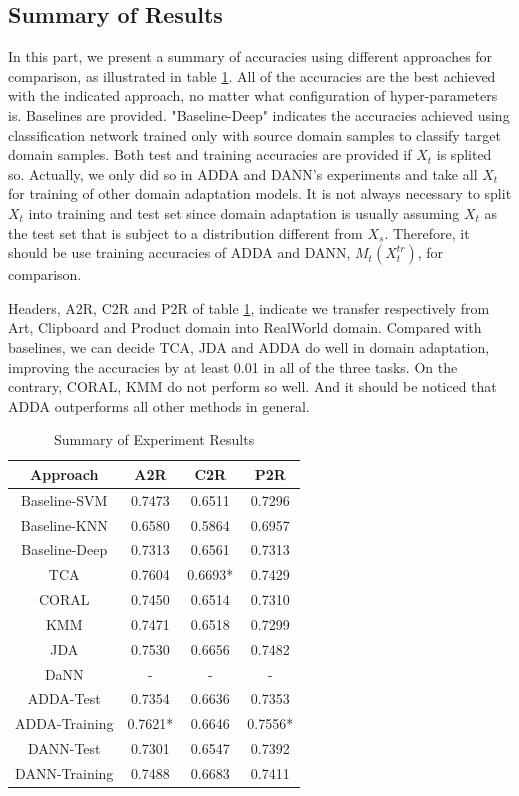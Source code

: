 \documentclass[conference]{IEEEtran}
\begin{document}
\subsection{Summary of Results}
In this part, we present a summary of accuracies using different approaches for comparison, as illustrated in table \ref{tab:ex_sum}. All of the accuracies are the best achieved with the indicated approach, no matter what configuration of hyper-parameters is. Baselines are provided. "Baseline-Deep" indicates the accuracies achieved using classification network trained only with source domain samples to classify target domain samples. Both test and training accuracies are provided if $X_t$ is splited so. Actually, we only did so in ADDA and DANN's experiments and take all $X_t$ for training of other domain adaptation models. It is not always necessary to split $X_t$ into training and test set since domain adaptation is usually assuming $X_t$ as the test set that is subject to a distribution different from $X_s$. Therefore, it should be use training accuracies of ADDA and DANN, $M_t(X^{tr}_t)$, for comparison.

Headers, A2R, C2R and P2R of table \ref{tab:ex_sum}, indicate we transfer respectively from Art, Clipboard and Product domain into RealWorld domain. Compared with baselines, we can decide TCA, JDA and ADDA do well in domain adaptation, improving the accuracies by at least 0.01 in all of the three tasks. On the contrary, CORAL, KMM do not perform so well. And it should be noticed that ADDA outperforms all other methods in general.
 \begin{table}[h]
	\centering
	\caption{Summary of Experiment Results}
	\label{tab:ex_sum}
	\begin{tabular}{cccc}
		\hline
		Approach & A2R & C2R & P2R\\
		\hline
		\hline
		Baseline-SVM &  0.7473 & 0.6511 & 0.7296 \\
        Baseline-KNN &  0.6580 & 0.5864 & 0.6957 \\
        Baseline-Deep &  0.7313 & 0.6561 & 0.7313 \\
		TCA &  0.7604 & 0.6693* & 0.7429 \\
		CORAL &  0.7450 &  0.6514 & 0.7310 \\
        KMM &  0.7471 &  0.6518 & 0.7299 \\
        JDA &  0.7530 &  0.6656 & 0.7482 \\
        DaNN &  - &  - & - \\
        ADDA-Test &  0.7354 &  0.6636 & 0.7353 \\
        ADDA-Training &  0.7621* &  0.6646 & 0.7556* \\
        DANN-Test &  0.7301 &  0.6547 & 0.7392 \\
        DANN-Training &  0.7488 &  0.6683 & 0.7411 \\
		\hline
	\end{tabular}
\end{table}
\end{document}
